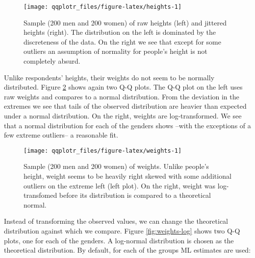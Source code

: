 \begin{Schunk}
\begin{figure}

{\centering \texttt{[image: qqplotr\_files/figure-latex/heights-1]} 

}

\caption[Sample (200 men and 200 women) of raw heights (left) and jittered heights (right)]{Sample (200 men and 200 women) of raw heights (left) and jittered heights (right). The distribution on the left is dominated by the discreteness of the data. On the right we see that except for some outliers an assumption of normality for people's height is not completely absurd.}\label{fig:heights}
\end{figure}
\end{Schunk}

Unlike respondents' heights, their weights do not seem to be normally
distributed. Figure \ref{fig:weights} shows again two Q-Q plots. The Q-Q
plot on the left uses raw weights and compares to a normal distribution.
From the deviation in the extremes we see that tails of the observed
distribution are heavier than expected under a normal distribution. On
the right, weights are log-transformed. We see that a normal
distribution for each of the genders shows --with the exceptions of a
few extreme outliers-- a reasonable fit.

\begin{Schunk}
\begin{figure}

{\centering \texttt{[image: qqplotr\_files/figure-latex/weights-1]} 

}

\caption[Sample (200 men and 200 women) of weights]{Sample (200 men and 200 women) of weights. Unlike people's height, weight seems to be heavily right skewed with some additional outliers on the extreme left (left plot). On the right, weight was log-transfomed before its distribution is compared to a theoretical normal. }\label{fig:weights}
\end{figure}
\end{Schunk}

Instead of transforming the observed values, we can change the
theoretical distribution against which we compare. Figure
\ref{fig:weights-log} shows two Q-Q plots, one for each of the genders.
A log-normal distribution is chosen as the theoretical distribution. By
default, for each of the groups ML estimates are used:


